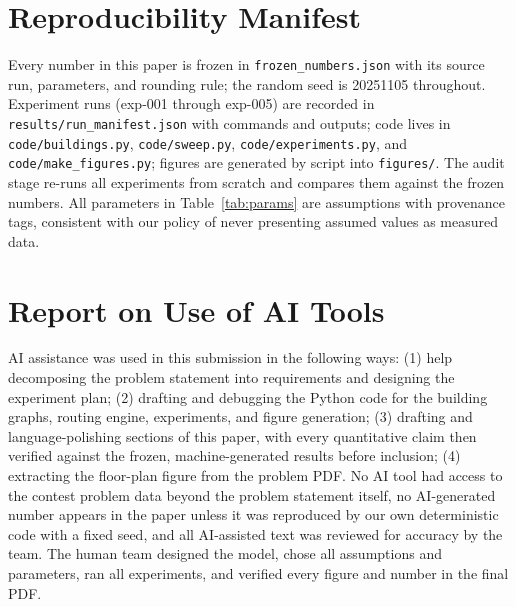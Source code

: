 \documentclass{mcmthesis}
\begin{document}
\section{Reproducibility Manifest}
Every number in this paper is frozen in \texttt{frozen\_numbers.json} with its source run, parameters, and rounding rule; the random seed is 20251105 throughout. Experiment runs (exp-001 through exp-005) are recorded in \texttt{results/run\_manifest.json} with commands and outputs; code lives in \texttt{code/buildings.py}, \texttt{code/sweep.py}, \texttt{code/experiments.py}, and \texttt{code/make\_figures.py}; figures are generated by script into \texttt{figures/}. The audit stage re-runs all experiments from scratch and compares them against the frozen numbers. All parameters in Table~\ref{tab:params} are assumptions with provenance tags, consistent with our policy of never presenting assumed values as measured data.

\section{Report on Use of AI Tools}
AI assistance was used in this submission in the following ways: (1) help decomposing the problem statement into requirements and designing the experiment plan; (2) drafting and debugging the Python code for the building graphs, routing engine, experiments, and figure generation; (3) drafting and language-polishing sections of this paper, with every quantitative claim then verified against the frozen, machine-generated results before inclusion; (4) extracting the floor-plan figure from the problem PDF. No AI tool had access to the contest problem data beyond the problem statement itself, no AI-generated number appears in the paper unless it was reproduced by our own deterministic code with a fixed seed, and all AI-assisted text was reviewed for accuracy by the team. The human team designed the model, chose all assumptions and parameters, ran all experiments, and verified every figure and number in the final PDF.
\end{document}
